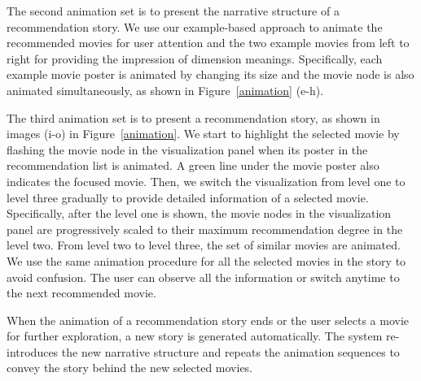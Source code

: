 \documentclass{vgtc}                          %
\begin{document}
The second animation set is to present the narrative structure of a recommendation story.
We use our example-based approach to animate the recommended movies for user attention and the two example movies from left to right for providing the impression of dimension meanings.
Specifically, each example movie poster is animated by changing its size and the movie node is also animated simultaneously, as shown in  Figure~\ref{animation} (e-h).


The third animation set is to present a recommendation story, as shown in images (i-o) in Figure~\ref{animation}.
We start to highlight the selected movie by flashing the movie node in the visualization panel when its poster in the recommendation list is animated.  
A green line under the movie poster also indicates the focused movie. 
Then, we switch the visualization from level one to level three gradually to provide detailed information of a selected movie.
Specifically, after the level one is shown, the movie nodes in the visualization panel are progressively scaled to their maximum recommendation degree in the level two.
From level two to level three, the set of similar movies are animated.
We use the same animation procedure for all the selected movies in the story to avoid confusion.
The user can observe all the information or switch anytime to the next recommended movie.

When the animation of a recommendation story ends or the user selects a movie for further exploration, a new story is generated automatically.
The system re-introduces the new narrative structure and repeats the animation sequences to convey the story behind the new selected movies.



\end{document}
